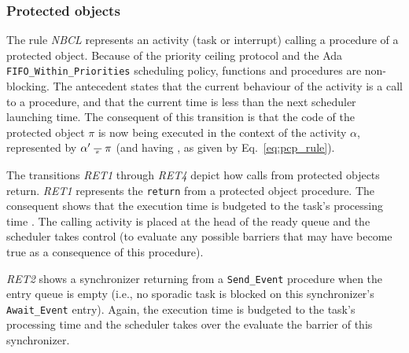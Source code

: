 \subsubsection{Protected objects}
The rule \emph{NBCL} represents an activity (task or interrupt)
calling a procedure of a protected object. Because of the priority
ceiling protocol and the Ada \texttt{FIFO\_Within\_Priorities}
scheduling policy, functions and procedures are non-blocking. The
antecedent states that the current behaviour of the activity is a call
to a procedure, and that the current time is less than the next
scheduler launching time. The consequent of this transition is that
the code of the protected object $\pi$ is now being executed in the
context of the activity $\alpha$, represented by $\alpha'\,\frac{}{\,^{{x}}\,}\,\pi$
(and having , as given by
Eq.~\ref{eq:pcp_rule}).


The transitions \emph{RET1} through \emph{RET4} depict how calls from
protected objects return. \emph{RET1} represents the \texttt{return}
from a protected object procedure. The consequent shows that the
execution time is budgeted to the task's processing time . The
calling activity is placed at the head of the ready queue and the
scheduler takes control (to evaluate any possible barriers that may
have become true as a consequence of this procedure).


\emph{RET2} shows a synchronizer returning from a \texttt{Send\_Event}
procedure when the entry queue is empty (i.e., no sporadic task is
blocked on this synchronizer's \texttt{Await\_Event} entry). Again,
the execution time is budgeted to the task's processing time 
and the scheduler takes over the evaluate the barrier of this
synchronizer.

